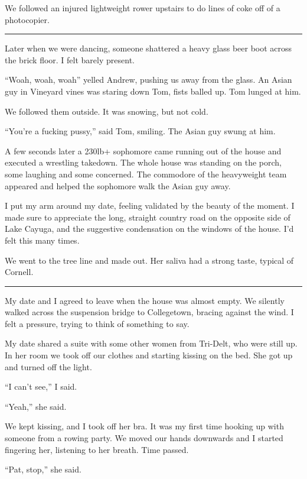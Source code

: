 We followed an injured lightweight rower upstairs to do lines of coke off of a
photocopier. 

\plainfancybreak{12pt}{2}{}


Later when we were dancing, someone shattered a heavy glass beer boot across the
brick floor.  I felt barely present.

``Woah, woah, woah'' yelled Andrew, pushing us away from the glass.  An Asian
guy in Vineyard vines was staring down Tom, fists balled up.  Tom lunged at him.

We followed them outside.  It was snowing, but not cold.

``You're a fucking pussy,'' said Tom, smiling.  The Asian guy swung at him. 

A few seconds later a 230lb+ sophomore came running out of the house and
executed a wrestling takedown.  The whole house was standing on the porch, some
laughing and some concerned.  The commodore of the heavyweight team appeared and
helped the sophomore walk the Asian guy away.

I put my arm around my date, feeling validated by the beauty of the moment.  I
made sure to appreciate the long, straight country road on the opposite side of
Lake Cayuga, and the suggestive condensation on the windows of the house.  I'd
felt this many times. 

We went to the tree line and made out.  Her saliva had a strong taste, typical
of Cornell.

\plainfancybreak{12pt}{2}{}

My date and I agreed to leave when the house was almost empty.  We silently
walked across the suspension bridge to Collegetown, bracing against the wind.  I
felt a pressure, trying to think of something to say.

My date shared a suite with some other women from Tri-Delt, who were still up.
In her room we took off our clothes and starting kissing on the bed.  She got up
and turned off the light.

``I can't see,'' I said.  

``Yeah,'' she said.

We kept kissing, and I took off her bra.  It was my first time hooking up with
someone from a rowing party.  We moved our hands downwards and I started
fingering her, listening to her breath.  Time passed.

``Pat, stop,'' she said.

